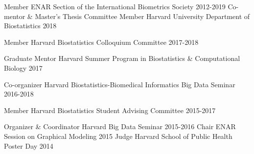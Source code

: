 

\begin{cvinvolves}
\cvinvolve
{Member} %
{ENAR Section of the International Biometrics Society} %
{} %
{2012-2019} %
\cvinvolve
{Co-mentor \& Master's Thesis Committee Member} %
{Harvard University Department of Biostatistics} %
{} %
{2018} %

  \cvinvolve
    {Member} %
    {Harvard Biostatistics Colloquium Committee} %
    {} %
    {2017-2018} %
    
    \cvinvolve
    {Graduate Mentor} %
    {Harvard Summer Program in Biostatistics \& Computational Biology} %
    {} %
    {2017} %

  \cvinvolve
    {Co-organizer} %
    {Harvard Biostatistics-Biomedical Informatics Big Data Seminar} %
    {} %
    {2016-2018} %
    
  \cvinvolve
    {Member} %
    {Harvard Biostatistics Student Advising Committee} %
    {} %
    {2015-2017} %

  \cvinvolve
    {Organizer \& Coordinator} %
    {Harvard Big Data Seminar} %
    {} %
    {2015-2016} %
  \cvinvolve
    {Chair} %
    {ENAR Session on Graphical Modeling} %
    {} %
    {2015} %
  \cvinvolve
    {Judge} %
    {Harvard School of Public Health Poster Day} %
    {} %
    {2014} %

\end{cvinvolves}
